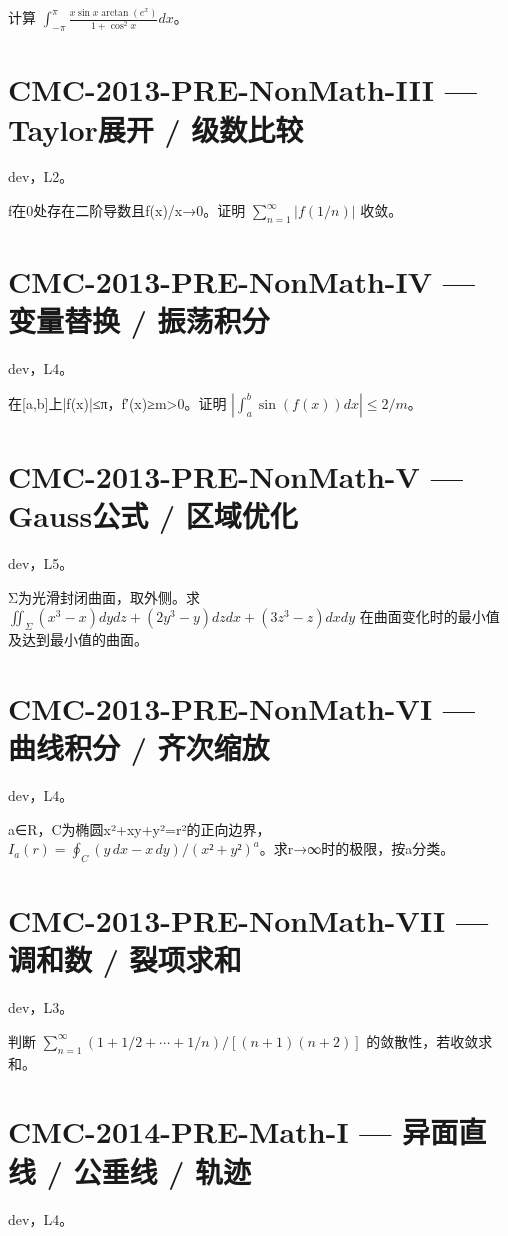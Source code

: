 \documentclass[UTF8]{ctexart}
\begin{document}
计算 $\int_{-\pi}^{\pi}\frac{x\sin x\arctan(e^x)}{1+\cos^2x}dx$。

\section*{CMC-2013-PRE-NonMath-III — Taylor展开 / 级数比较}

dev，L2。

f在0处存在二阶导数且f(x)/x→0。证明 $\sum_{n=1}^\infty|f(1/n)|$ 收敛。

\section*{CMC-2013-PRE-NonMath-IV — 变量替换 / 振荡积分}

dev，L4。

在[a,b]上|f(x)|≤π，f′(x)≥m>0。证明 $|\int_a^b\sin(f(x))dx|\le2/m$。

\section*{CMC-2013-PRE-NonMath-V — Gauss公式 / 区域优化}

dev，L5。

Σ为光滑封闭曲面，取外侧。求 $\iint_\Sigma(x^3-x)dydz+(2y^3-y)dzdx+(3z^3-z)dxdy$ 在曲面变化时的最小值及达到最小值的曲面。

\section*{CMC-2013-PRE-NonMath-VI — 曲线积分 / 齐次缩放}

dev，L4。

a∈R，C为椭圆x²+xy+y²=r²的正向边界，$I_a(r)=\oint_C(y\,dx-x\,dy)/(x²+y²)^a$。求r→∞时的极限，按a分类。

\section*{CMC-2013-PRE-NonMath-VII — 调和数 / 裂项求和}

dev，L3。

判断 $\sum_{n=1}^\infty(1+1/2+\cdots+1/n)/[(n+1)(n+2)]$ 的敛散性，若收敛求和。

\section*{CMC-2014-PRE-Math-I — 异面直线 / 公垂线 / 轨迹}

dev，L4。
\end{document}
